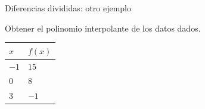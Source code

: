 \documentclass[main.tex]{subfiles}
\begin{document}
\begin{frame}[t]{Diferencias divididas: otro ejemplo}
\par\noindent\begin{minipage}[t][12mm][t]{\textwidth}\small\strut Obtener el polinomio interpolante de los datos dados.\end{minipage}\par\nointerlineskip
\begingroup\small\setlength{\tabcolsep}{3pt}\begin{center}\begin{tabular}{|C{.2\textwidth}|C{.2\textwidth}|}\hline
\rule[-2mm]{0pt}{6mm}$x$&$f(x)$\\\hline
\rule[-2.5mm]{0pt}{7mm}$-1$&$15$\\\hline
\rule[-2.5mm]{0pt}{7mm}$0$&$8$\\\hline
\rule[-2.5mm]{0pt}{7mm}$3$&$-1$\\\hline
\end{tabular}\end{center}\endgroup\par

\end{frame}
\end{document}
